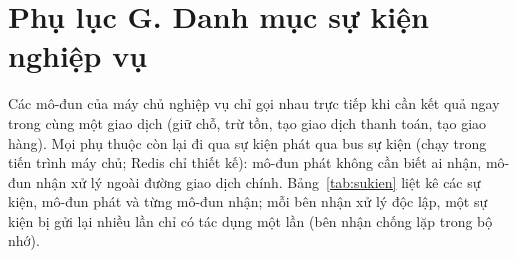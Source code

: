 
\section*{Phụ lục G. Danh mục sự kiện nghiệp vụ}
\label{apdx:sukien}

Các mô-đun của máy chủ nghiệp vụ chỉ gọi nhau trực tiếp khi cần kết quả ngay trong
cùng một giao dịch (giữ chỗ, trừ tồn, tạo giao dịch thanh toán, tạo giao hàng).
Mọi phụ thuộc còn lại đi qua sự kiện phát qua bus sự kiện (chạy trong tiến trình máy chủ; Redis chỉ thiết kế): mô-đun phát không cần biết
ai nhận, mô-đun nhận xử lý ngoài đường giao dịch chính. Bảng~\ref{tab:sukien}
liệt kê các sự kiện, mô-đun phát và từng mô-đun nhận; mỗi bên nhận xử lý độc
lập, một sự kiện bị gửi lại nhiều lần chỉ có tác dụng một lần (bên nhận chống lặp trong bộ nhớ).

